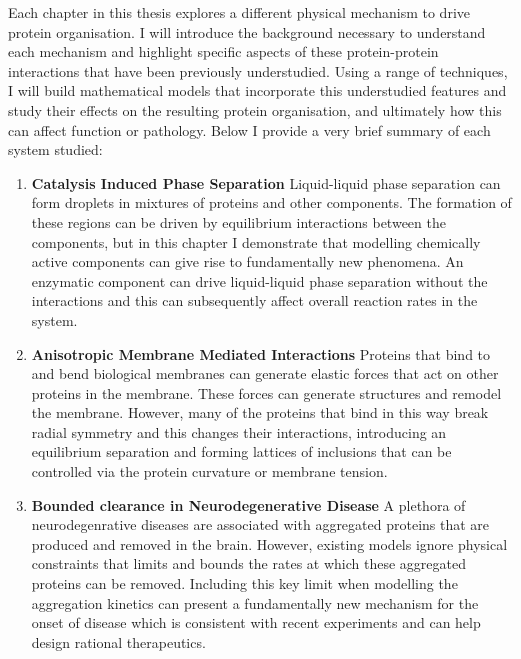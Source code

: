 Each chapter in this thesis explores a different physical mechanism to drive protein organisation. I will introduce the background necessary to understand each mechanism and highlight specific aspects of these protein-protein interactions that have been previously understudied. Using a range of techniques, I will build mathematical models that incorporate this understudied features and study their effects on the resulting protein organisation, and ultimately how this can affect function or pathology. Below I provide a very brief summary of each system studied:
\begin{enumerate}
    \item \textbf{Catalysis Induced Phase Separation} Liquid-liquid phase separation can form droplets in mixtures of proteins and other components. The formation of these regions can be driven by equilibrium interactions between the components, but in this chapter I demonstrate that modelling chemically active components can give rise to fundamentally new phenomena. An enzymatic component can drive liquid-liquid phase separation without the interactions and this can subsequently affect overall reaction rates in the system.
    \item \textbf{Anisotropic Membrane Mediated Interactions} Proteins that bind to and bend biological membranes can generate elastic forces that act on other proteins in the membrane. These forces can generate structures and remodel the membrane. However, many of the proteins that bind in this way break radial symmetry and this changes their interactions, introducing an equilibrium separation and forming lattices of inclusions that can be controlled via the protein curvature or membrane tension.
    \item \textbf{Bounded clearance in Neurodegenerative Disease} A plethora of neurodegenrative diseases are associated with aggregated proteins that are produced and removed in the brain. However, existing models ignore physical constraints that limits and bounds the rates at which these aggregated proteins can be removed. Including this key limit when modelling the aggregation kinetics can present a fundamentally new mechanism for the onset of disease which is consistent with recent experiments and can help design rational therapeutics.
\end{enumerate}
